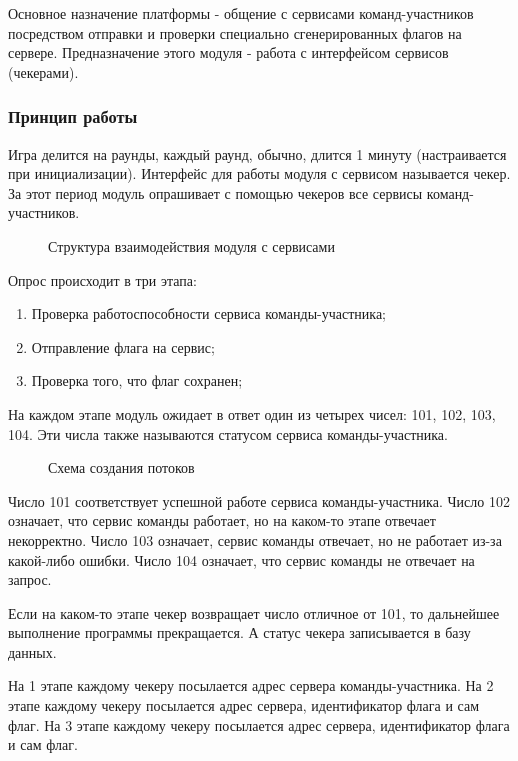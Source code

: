 Основное назначение платформы - общение с сервисами команд-участников посредством отправки и проверки специально сгенерированных флагов на сервере. Предназначение этого модуля - работа с интерфейсом сервисов (чекерами).

\subsubsection{Принцип работы}
Игра делится на раунды, каждый раунд, обычно, длится 1 минуту (настраивается при инициализации). Интерфейс для работы модуля с сервисом называется чекер. За этот период модуль опрашивает с помощью чекеров все сервисы команд-участников.

\begin{figure}[h!]
\caption{Структура взаимодействия модуля с сервисами}
\end{figure}

Опрос происходит в три этапа:
\begin{enumerate} 
\item Проверка работоспособности сервиса команды-участника;
\item Отправление флага на сервис; 
\item Проверка того, что флаг сохранен;
\end{enumerate}

На каждом этапе модуль ожидает в ответ один из четырех чисел: 101, 102, 103, 104. Эти числа также называются статусом сервиса команды-участника.

\begin{figure}[h!]
\caption{Схема создания потоков}
\end{figure}
\clearpage

Число 101 соответствует успешной работе сервиса команды-участника. Число 102 означает, что сервис команды работает, но на каком-то этапе отвечает некорректно. Число 103 означает, сервис команды отвечает, но не работает из-за какой-либо ошибки. Число 104 означает, что сервис команды не отвечает на запрос. 

Если на каком-то этапе чекер возвращает число отличное от 101, то дальнейшее выполнение программы прекращается. А статус чекера записывается в базу данных.

На 1 этапе каждому чекеру посылается адрес сервера команды-участника. 
На 2 этапе каждому чекеру посылается адрес сервера, идентификатор флага и сам флаг. 
На 3 этапе каждому чекеру посылается адрес сервера, идентификатор флага и сам флаг.

